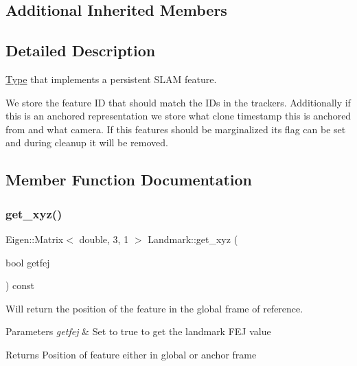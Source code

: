 \subsection*{Additional Inherited Members}


\subsection{Detailed Description}
\hyperlink{classov__type_1_1Type}{Type} that implements a persistent S\+L\+AM feature. 

We store the feature ID that should match the I\+Ds in the trackers. Additionally if this is an anchored representation we store what clone timestamp this is anchored from and what camera. If this features should be marginalized its flag can be set and during cleanup it will be removed. 

\subsection{Member Function Documentation}
\mbox{\label{classov__type_1_1Landmark_aa4f66d5e3954beea3f05b8b757561132}} 
\subsubsection{\texorpdfstring{get\+\_\+xyz()}{get\_xyz()}}
{\footnotesize\ttfamily Eigen\+::\+Matrix$<$ double, 3, 1 $>$ Landmark\+::get\+\_\+xyz (\begin{DoxyParamCaption}\item[{bool}]{getfej }\end{DoxyParamCaption}) const}



Will return the position of the feature in the global frame of reference. 


\begin{DoxyParams}{Parameters}
{\em getfej} & Set to true to get the landmark F\+EJ value \\
\hline
\end{DoxyParams}
\begin{DoxyReturn}{Returns}
Position of feature either in global or anchor frame 
\end{DoxyReturn}
\mbox{\label{classov__type_1_1Landmark_ac34319e2057c3c63154cef9a9aa08a2e}} 
